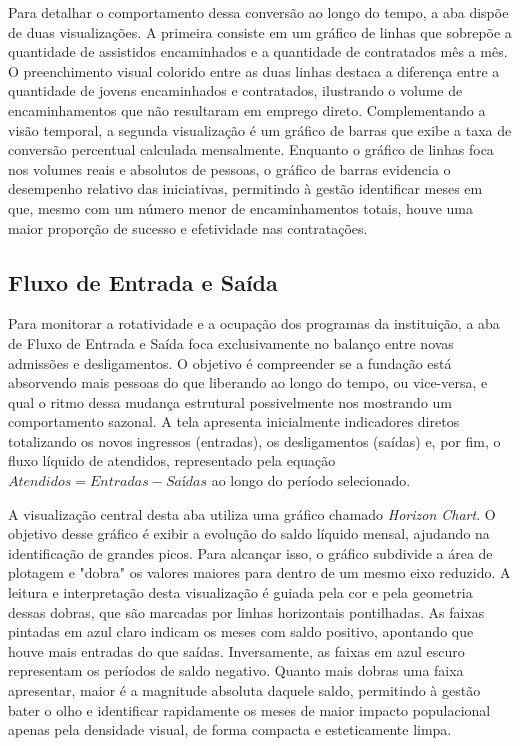 \documentclass[12pt]{article}
\begin{document}
Para detalhar o comportamento dessa conversão ao longo do tempo, a aba dispõe de duas visualizações. A primeira consiste em um gráfico de linhas que sobrepõe a quantidade de assistidos encaminhados e a quantidade de contratados mês a mês. O preenchimento visual colorido entre as duas linhas destaca a diferença entre a quantidade de jovens encaminhados e contratados, ilustrando o volume de encaminhamentos que não resultaram em emprego direto. Complementando a visão temporal, a segunda visualização é um gráfico de barras que exibe a taxa de conversão percentual calculada mensalmente. Enquanto o gráfico de linhas foca nos volumes reais e absolutos de pessoas, o gráfico de barras evidencia o desempenho relativo das iniciativas, permitindo à gestão identificar meses em que, mesmo com um número menor de encaminhamentos totais, houve uma maior proporção de sucesso e efetividade nas contratações.

\subsection{Fluxo de Entrada e Saída}
Para monitorar a rotatividade e a ocupação dos programas da instituição, a aba de Fluxo de Entrada e Saída foca exclusivamente no balanço entre novas admissões e desligamentos. O objetivo é compreender se a fundação está absorvendo mais pessoas do que liberando ao longo do tempo, ou vice-versa, e qual o ritmo dessa mudança estrutural possivelmente nos mostrando um comportamento sazonal. A tela apresenta inicialmente indicadores diretos totalizando os novos ingressos (entradas), os desligamentos (saídas) e, por fim, o fluxo líquido de atendidos, representado pela equação $Atendidos = Entradas - Saídas$ ao longo do período selecionado.

A visualização central desta aba utiliza uma gráfico chamado \textit{Horizon Chart}. O objetivo desse gráfico é exibir a evolução do saldo líquido mensal, ajudando na identificação de grandes picos. Para alcançar isso, o gráfico subdivide a área de plotagem e "dobra" os valores maiores para dentro de um mesmo eixo reduzido. A leitura e interpretação desta visualização é guiada pela cor e pela geometria dessas dobras, que são marcadas por linhas horizontais pontilhadas. As faixas pintadas em azul claro indicam os meses com saldo positivo, apontando que houve mais entradas do que saídas. Inversamente, as faixas em azul escuro representam os períodos de saldo negativo. Quanto mais dobras uma faixa apresentar, maior é a magnitude absoluta daquele saldo, permitindo à gestão bater o olho e identificar rapidamente os meses de maior impacto populacional apenas pela densidade visual, de forma compacta e esteticamente limpa.
\end{document}
